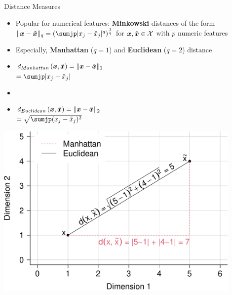 % 
\begin{vbframe}{Distance Measures}





  
  
\begin{itemize}
  \item Popular for numerical features: \textbf{Minkowski} distances
  of the form $\| \xv - \tilde \xv \|_q = \left( \sumjp |x_j - \tilde x_j|^q 
  \right)^{\frac{1}{q}}$ for $\bm{x}, \tilde{\bm{x}} \in \mathcal{X}$ with $p$ numeric 
  features
  \item Especially, \textbf{Manhattan} ($q = 1$) and \textbf{Euclidean} 
  ($q = 2$) distance 
\end{itemize}

\vspace{0.3cm}

\begin{minipage}{0.42\textwidth}
  \begin{itemize}
    \small
    \item[] $d_{Manhattan}\left(\bm{x}, \tilde{\bm{x}}\right) = \| \bm{x} - 
    \tilde {\bm{x}} \|_1$ \\
    $=\sumjp |x_j - \tilde{x}_j| $
    \item[]
    \item[] $d_{Euclidean}\left(\bm{x}, \tilde{\bm{x}}\right) = \| \bm{x} - 
    \tilde {\bm{x}} \|_2$ \\
    \vspace{0.1cm}
    $= \sqrt{\sumjp(x_j- \tilde{x}_j)^2}$
  \end {itemize}
\end{minipage}%
\begin{minipage}{0.58\textwidth}
 \centering \includegraphics[width=0.9\textwidth,keepaspectratio]{figure/reg_knn_2} 
\end{minipage}
     


\end{vbframe}




